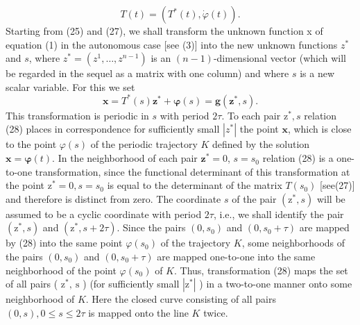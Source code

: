 \documentclass[10pt,a5paper]{book}
\makeatletter
\theoremstyle{plain}
\theoremstyle{definition}
\theoremstyle{remark}
\renewenvironment{proof}[1][\proofname]{\par
  \pushQED{\qed}%
  \normalfont\topsep6\p@\@plus6\p@\relax
  \trivlist
  \item\relax{\itshape #1\@addpunct{.}}\hspace\labelsep\ignorespaces
}{\popQED\endtrivlist\@endpefalse}
\makeatother
\begin{document}
\begin{proof}[Proof of Theorem 26]
\begin{equation*}
T(t)=\left(T^{*}(t), \dot{\varphi}(t)\right) . \tag{27}
\end{equation*}
Starting from (25) and (27), we shall transform the unknown function x of equation (1) in the autonomous case [see (3)] into the new unknown functions $z^{*}$ and $s$, where $z^{*}=\left(z^{1}, \ldots, z^{n-1}\right)$ is an $(n-1)$-dimensional vector (which will be regarded in the sequel as a matrix with one column) and where $s$ is a new scalar variable. For this we set
\begin{equation*}
\mathbf{x}=T^{*}(s) \mathbf{z}^{*}+\boldsymbol{\varphi}(s)=\mathbf{g}\left(\mathbf{z}^{*}, s\right) . \tag{28}
\end{equation*}
This transformation is periodic in $s$ with period $2 \tau$. To each pair $\mathrm{z}^{*}, s$ relation (28) places in correspondence for sufficiently small $\left|z^{*}\right|$ the point $\mathbf{x}$, which is close to the point $\varphi(s)$ of the periodic trajectory $K$ defined by the solution $\mathbf{x}=\boldsymbol{\varphi}(t)$. In the neighborhood of each pair $\mathbf{z}^{*}=0$, $s=s_{0}$ relation (28) is a one-to-one transformation, since the functional determinant of this transformation at the point $\mathrm{z}^{*}=0, s=s_{0}$ is equal to the determinant of the matrix $T\left(s_{0}\right)$ [see(27)] and therefore is distinct from zero. The coordinate $s$ of the pair $\left(\mathrm{z}^{*}, s\right)$ will be assumed to be a cyclic coordinate with period $2 \tau$, i.e., we shall identify the pair $\left(\mathrm{z}^{*}, s\right)$ and $\left(\mathrm{z}^{*}, s+2 \tau\right)$. Since the pairs $\left(0, s_{0}\right)$ and $\left(0, s_{0}+\tau\right)$ are mapped by (28) into the same point $\varphi\left(s_{0}\right)$ of the trajectory $K$, some neighborhoods of the pairs $\left(0, s_{0}\right)$ and $\left(0, s_{0}+\tau\right)$ are mapped one-to-one into the same neighborhood of the point $\varphi\left(s_{0}\right)$ of $K$. Thus, transformation (28) maps the set of all pairs ( $\mathrm{z}^{*}, \mathrm{~s}$ ) (for sufficiently small $\left|\mathrm{z}^{*}\right|$ ) in a two-to-one manner onto some neighborhood of $K$. Here the closed curve consisting of all pairs $(0, s), 0 \leq s \leq 2 \tau$ is mapped onto the line $K$ twice.


\end{proof}
\end{document}
